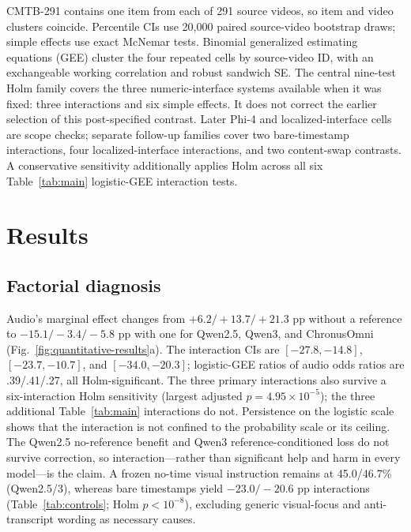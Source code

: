 CMTB-291 contains one item from each of 291 source videos, so item and video clusters coincide. Percentile CIs use 20,000 paired source-video bootstrap draws; simple effects use exact McNemar tests. Binomial generalized estimating equations (GEE) cluster the four repeated cells by source-video ID, with an exchangeable working correlation and robust sandwich SE. The central nine-test Holm family covers the three numeric-interface systems available when it was fixed: three interactions and six simple effects. It does not correct the earlier selection of this post-specified contrast. Later Phi-4 and localized-interface cells are scope checks; separate follow-up families cover two bare-timestamp interactions, four localized-interface interactions, and two content-swap contrasts. A conservative sensitivity additionally applies Holm across all six Table~\ref{tab:main} logistic-GEE interaction tests.

\section{Results}
\label{sec:results}

\subsection{Factorial diagnosis}

Audio's marginal effect changes from $+6.2/+13.7/+21.3$ pp without a reference to $-15.1/-3.4/-5.8$ pp with one for Qwen2.5, Qwen3, and ChronusOmni (Fig.~\ref{fig:quantitative-results}a). The interaction CIs are $[-27.8,-14.8]$, $[-23.7,-10.7]$, and $[-34.0,-20.3]$; logistic-GEE ratios of audio odds ratios are .39/.41/.27, all Holm-significant. The three primary interactions also survive a six-interaction Holm sensitivity (largest adjusted $p=4.95\!\times\!10^{-5}$); the three additional Table~\ref{tab:main} interactions do not. Persistence on the logistic scale shows that the interaction is not confined to the probability scale or its ceiling. The Qwen2.5 no-reference benefit and Qwen3 reference-conditioned loss do not survive correction, so interaction---rather than significant help and harm in every model---is the claim. A frozen no-time visual instruction remains at 45.0/46.7\% (Qwen2.5/3), whereas bare timestamps yield $-23.0/-20.6$ pp interactions (Table~\ref{tab:controls}; Holm $p<10^{-8}$), excluding generic visual-focus and anti-transcript wording as necessary causes.

